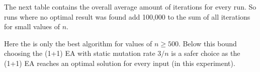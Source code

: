 

The next table contains the overall average amount of iterations for every run.
So runs where no optimal result was found add 100,000 to the sum of all iterations for small values of $n$.



Here the \RLSN[2] is only the best algorithm for values of $n \ge 500$.
Below this bound choosing the (1+1) EA with static mutation rate $3/n$ is a safer choice as the (1+1) EA reaches an optimal solution for every input (in this experiment).
